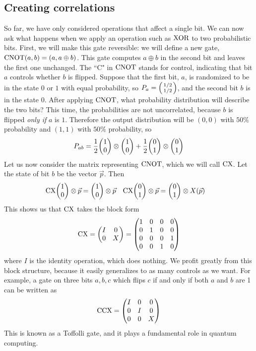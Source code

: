 \documentclass{article}
\newcommand{\XOR}{\ensuremath\text{XOR}}
\newcommand{\CX}{\ensuremath\text{CX}}
\newcommand{\CNOT}{\ensuremath\text{CNOT}}
\newcommand{\CCX}{\ensuremath\text{CCX}}
\begin{document}
\subsection{Creating correlations}
So far, we have only considered operations that affect a single bit. We can now ask what happens when we apply an operation such as $\XOR$ to two probabilistic bits. First, we will make this gate reversible: we will define a new gate, $\CNOT(a,b) = (a, a\oplus b)$. This gate computes $a \oplus b$ in the second bit and leaves the first one unchanged. The ``C" in $\CNOT$ stands for control, indicating that bit $a$ controls whether $b$ is flipped. Suppose that the first bit, $a$, is randomized to be in the state $0$ or $1$ with equal probability, so $P_a = \smqty(1/2 \\ 1/2)$, and the second bit $b$ is in the state 0. After applying $\CNOT$, what probability distribution will describe the two bits? This time, the probabilities are not uncorrelated, because $b$ is flipped \textit{only if} $a$ is $1$. Therefore the output distribution will be $(0,0)$ with $50\%$ probability and $(1,1)$ with $50\%$ probability, so
$$
P_{ab} = \frac{1}{2}\mqty(1 \\ 0) \otimes \mqty(1 \\ 0) + \frac{1}{2}\mqty(0 \\ 1) \otimes \mqty(0 \\ 1)
$$
Let us now consider the matrix representing $\CNOT$, which we will call $\CX$. Let the state of bit $b$ be the vector $\vec p$. Then
\begin{align*}
\CX \mqty(1 \\ 0) \otimes \vec p &= \mqty(1 \\ 0) \otimes \vec p & \CX \mqty(0 \\ 1) \otimes \vec p &= \mqty(0 \\ 1) \otimes X(\vec p) 
\end{align*}
This shows us that $\CX$ takes the block form
$$
\CX = \mqty(I & 0 \\ 0 & X) = \mqty(1 & 0 & 0 & 0\\ 0 & 1 & 0 & 0 \\ 0 & 0 & 0 & 1\\ 0 & 0 & 1 & 0)
$$
where $I$ is the identity operation, which does nothing. We profit greatly from this block structure, because it easily generalizes to as many controls as we want. For example, a gate on three bits $a,b,c$ which flips $c$ if and only if both $a$ and $b$ are 1 can be written as
$$
\CCX = \mqty(I & 0 & 0\\ 0 & I & 0\\ 0 & 0 & X)
$$
This is known as a Toffolli gate, and it plays a fundamental role in quantum computing. 
\end{document}
